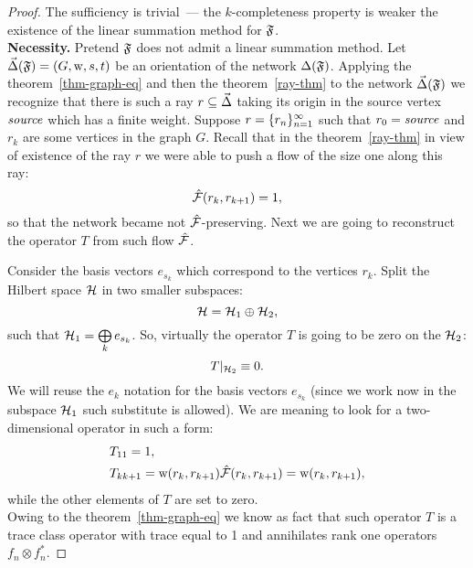 \documentclass[12pt]{article}
\begin{document}
      \begin{proof}
        The sufficiency is trivial~--- the $k$-completeness property is weaker the existence of the linear summation method
          for $\fsys$.\\
        \noindent\textbf{Necessity.}
        Pretend $\fsys$ does not admit a linear summation method.
        Let $\onet(\fsys) = (G, \wtp, s, t)$ be an orientation of the network $\net(\fsys)$.
        Applying the theorem~\ref{thm-graph-eq} and then the theorem~\ref{ray-thm} to the network $\onet(\fsys)$
          we recognize that there is such a ray $r \subseteq \onet$ taking its origin
          in the source vertex $\source$ which has a finite weight.
        Suppose $r = \seq{r}$ such that $r_0 = \source$ and $r_k$ are some vertices in the graph $G$.
        Recall that in the theorem~\ref{ray-thm} in view of existence of the ray $r$ we were able to push
          a flow of the size one along this ray:
        \[
          \flow(r_k, r_{k+1}) = 1,
        \]
        so that the network became not $\flow$-preserving.
        Next we are going to reconstruct the operator $T$ from such flow $\flow$.

        Consider the basis vectors $e_{s_k}$ which correspond to the vertices $r_k$.
        Split the Hilbert space $\cal{H}$ in two smaller subspaces:
        \[
          \cal{H} = \cal{H}_1 \oplus \cal{H}_2,
        \]
        such that $\cal{H}_1 = \bigoplus\limits_k e_{s_k}$.
        So, virtually the operator $T$ is going to be zero on the $\cal{H}_2$:
        \[
          T\vert_{\cal{H}_2} \equiv 0.
        \]
        We will reuse the $e_k$ notation for the basis vectors $e_{s_k}$ (since we work now in the subspace $\cal{H}_1$
          such substitute is allowed).
        We are meaning to look for a two-dimensional operator in such a form:
        \begin{align*}
          &T_{11} = 1,\\
          &T_{k k+1} = \wtp(r_k, r_{k+1}) \flow(r_k, r_{k+1}) = \wtp(r_k, r_{k+1}),
        \end{align*}
        while the other elements of $T$ are set to zero.\\
        Owing to the theorem~\ref{thm-graph-eq} we know as fact that such operator $T$ is
          a trace class operator with trace equal to 1 and annihilates rank one operators $f_n \otimes f^{*}_n$.
      

    \end{proof}
\end{document}
